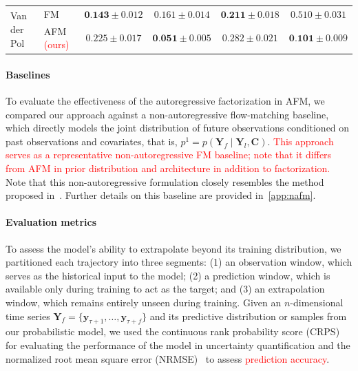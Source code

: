 \documentclass[a4paper,10pt,twocolumn,preprint,3p]{elsarticle}
\begin{document}
\begin{table}[!ht]
\begin{small}
\begin{tabular}{l l cc cc}
        \midrule
        \multirow{2}{*}{Van der Pol} 
            & FM  & $\textbf{0.143} \pm 0.012$ & $0.161 \pm 0.014$ & $\textbf{0.211} \pm 0.018$ & $0.510 \pm 0.031$ \\
            & AFM \textcolor{red}{(ours)} & $0.225 \pm 0.017$ & $\textbf{0.051} \pm 0.005$ & $0.282 \pm 0.021$ & $\textbf{0.101} \pm 0.009$ \\
        \bottomrule
    \end{tabular}
    \end{small}
    \label{table:dynamical_systems}
\end{table}

\paragraph{Baselines} To evaluate the effectiveness of the autoregressive factorization in AFM, we compared our approach against a non-autoregressive flow-matching baseline, which directly models the joint distribution of future observations conditioned on past observations and covariates, that is,  ${p^1 =p(\mathbf{Y}_f \mid \mathbf{Y}_l, \mathbf{C})}$. 
\textcolor{red}{This approach serves as a representative non-autoregressive FM baseline; note that it differs from AFM in prior distribution and architecture in addition to factorization.} Note that this non-autoregressive formulation closely resembles the method proposed in~\citep{Kerrigan2024Flow}. Further details on this baseline are provided in~\ref{app:nafm}.


\paragraph{Evaluation metrics}
To assess the model’s ability to extrapolate beyond its training distribution, we partitioned each trajectory into three segments: (1) an observation window, which serves as the historical input to the model; (2) a prediction window, which is available only during training to act as the target; and (3) an extrapolation window, which remains entirely unseen during training. Given an $n$-dimensional time series $\mathbf{Y}_f = \{\mathbf{y}_{\tau+1}, \ldots, \mathbf{y}_{\tau+f}\}$ and its predictive distribution or samples from our probabilistic model, we used the continuous rank probability score (CRPS)~\citep{winkler1996scoring} for evaluating the performance of the model in uncertainty quantification and the normalized root mean square error (NRMSE)~\citep{hyndman2006another} to assess \textcolor{red}{prediction accuracy}.
\end{document}

